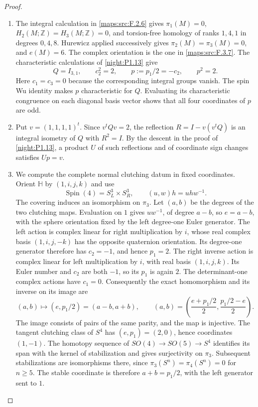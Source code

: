 \begin{proof}
\begin{enumerate}[label={$\langle1\rangle$\arabic*.}]
\item The integral calculation in \cref{maps:src:F.2.6} gives
$\pi_1(M)=0$, $H_2(M;\mathbb Z)=H_3(M;\mathbb Z)=0$, and
torsion-free homology of ranks $1,4,1$ in degrees $0,4,8$.
Hurewicz applied successively gives $\pi_2(M)=\pi_3(M)=0$, and
$e(M)=6$. The complex orientation is the one in
\cref{maps:src:F.3.7}. The characteristic calculations of \cref{night:P1.13} give
\[
Q=I_{3,1},\qquad c_2^2=2,\qquad
p:=p_1/2=-c_2,\qquad p^2=2.
\]
Here $c_1=c_3=0$ because the corresponding integral groups vanish.
The spin Wu identity makes $p$ characteristic for $Q$. Evaluating
its characteristic congruence on each diagonal basis vector shows
that all four coordinates of $p$ are odd.

\item Put $v=(1,1,1,1)^t$.  Since $v^tQv=2$, the reflection $R=I-v(v^tQ)$ is an integral isometry of $Q$ with $R^2=I$.  By the descent in the proof of \cref{night:P1.13}, a product $U$ of such reflections and of coordinate sign changes satisfies $Up=v$.

\item We compute the complete normal clutching datum in fixed
coordinates. Orient $\mathbb H$ by $(1,i,j,k)$ and use
\[
\operatorname{Spin}(4)=S^3_L\times S^3_R,
\qquad (u,w)h=uhw^{-1}.
\]
The covering induces an isomorphism on $\pi_3$. Let $(a,b)$ be
the degrees of the two clutching maps. Evaluation on $1$ gives
$uw^{-1}$, of degree $a-b$, so $e=a-b$, with the sphere orientation
fixed by the left degree-one Euler generator. The left action is
complex linear for right multiplication by $i$, whose real complex
basis $(1,i,j,-k)$ has the opposite quaternion orientation. Its
degree-one generator therefore has $c_2=-1$, and hence $p_1=2$.
The right inverse action is complex linear for left multiplication
by $i$, with real basis $(1,i,j,k)$. Its Euler number and $c_2$ are
both $-1$, so its $p_1$ is again $2$. The determinant-one complex
actions have $c_1=0$. Consequently the exact homomorphism and its
inverse on its image are
\[
(a,b)\longmapsto(e,p_1/2)=(a-b,a+b),
\qquad
(a,b)=\left(\frac{e+p_1/2}{2},\frac{p_1/2-e}{2}\right).
\]
The image consists of pairs of the same parity, and the map is
injective. The tangent clutching class of $S^4$ has $(e,p_1)=(2,0)$,
hence coordinates $(1,-1)$. The homotopy sequence of
$SO(4)\to SO(5)\to S^4$ identifies its span with the kernel of
stabilization and gives surjectivity on $\pi_3$. Subsequent
stabilizations are isomorphisms there, since
$\pi_3(S^n)=\pi_4(S^n)=0$ for $n\geq5$.
The stable coordinate is therefore $a+b=p_1/2$, with the left
generator sent to $1$.


\end{enumerate}
\end{proof}
